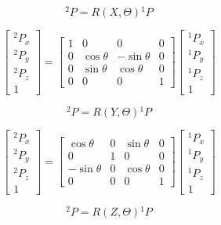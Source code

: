 \begin{multicols}{2}

    

\[
  {}^2P = R(X, \varTheta ) {}^1P 
\]

\[
    \begin{bmatrix}
        {}^2P_x \\
        {}^2P_y \\
        {}^2P_z \\
        1
    \end{bmatrix}
    =
    \begin{bmatrix}
        1 & 0 & 0 & 0 \\
        0 & \cos\theta & -\sin\theta & 0 \\
        0 & \sin\theta & \cos\theta & 0 \\
        0 & 0 & 0 & 1
    \end{bmatrix}
    \begin{bmatrix}
        {}^1P_x \\
        {}^1P_y \\
        {}^1P_z \\
        1
    \end{bmatrix}   
\]

\[
  {}^2P = R(Y, \varTheta ) {}^1P 
\]

\[
    \begin{bmatrix}
        {}^2P_x \\
        {}^2P_y \\
        {}^2P_z \\
        1
    \end{bmatrix}
    =
    \begin{bmatrix}
        \cos\theta & 0 & \sin\theta & 0 \\
        0 & 1 & 0 & 0 \\
        -\sin\theta & 0 & \cos\theta & 0 \\
        0 & 0 & 0 & 1
    \end{bmatrix}
    \begin{bmatrix}
        {}^1P_x \\
        {}^1P_y \\
        {}^1P_z \\
        1
    \end{bmatrix}   
\]
\end{multicols}
\[
  {}^2P = R(Z, \varTheta ) {}^1P 
\]

